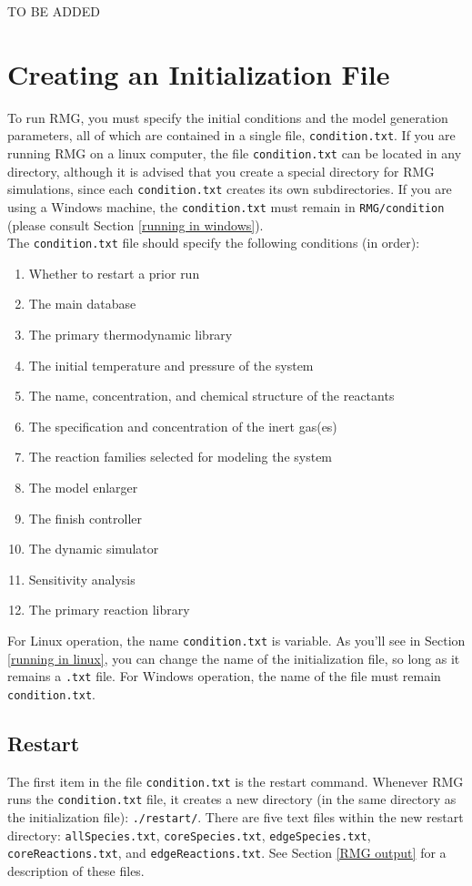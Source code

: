 \documentclass[12pt,letterpaper]{article}
\begin{document}
TO BE ADDED

\section{Creating an Initialization File}
To run RMG, you must specify the initial conditions and the model generation
parameters, all of which are contained in a single file, \texttt{condition.txt}. If you
are running RMG on a linux computer, the file \texttt{condition.txt} can be located
in any directory, although it is advised that you create a special directory
for RMG simulations, since each \texttt{condition.txt} creates its own subdirectories.
If you are using a Windows machine, the \texttt{condition.txt} must remain in
\texttt{RMG/condition} (please consult Section \ref{running in windows}).\\
The \texttt{condition.txt} file should specify the following conditions (in order):

\begin{enumerate}
\item Whether to restart a prior run
\item The main database
\item The primary thermodynamic library
\item The initial temperature and pressure of the system
\item The name, concentration, and chemical structure of the reactants
\item The specification and concentration of the inert gas(es)
\item The reaction families selected for modeling the system
\item The model enlarger
\item The finish controller
\item The dynamic simulator
\item Sensitivity analysis
\item The primary reaction library
\end{enumerate}

For Linux operation, the name \texttt{condition.txt} is variable. As you'll see in
Section \ref{running in linux}, you can change the name of the initialization file, so long as it
remains a \texttt{.txt} file. For Windows operation, the name of the file must remain
\texttt{condition.txt}.

\subsection{Restart}\label{restart}
The first item in the file \texttt{condition.txt} is the restart command. Whenever
RMG runs the \texttt{condition.txt} file, it creates a new directory (in the same directory
as the initialization file): \texttt{./restart/}. There are five text files within
the new restart directory: \texttt{allSpecies.txt}, \texttt{coreSpecies.txt}, \texttt{edgeSpecies.txt}, \texttt{coreReactions.txt}, and \texttt{edgeReactions.txt}. See Section \ref{RMG output} for a description of
these files.\\
\end{document}

